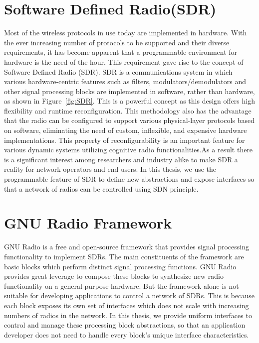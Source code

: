 \section{Software Defined Radio(SDR)}
Most of the wireless protocols in use today are implemented in hardware. With the ever increasing number of protocols to be supported and their diverse requirements, it has become apparent that a programmable environment for hardware is the need of the hour. This requirement gave rise to the concept of Software Defined Radio (SDR). SDR is a communications system in which various hardware-centric features such as filters, modulators/demodulators and other signal processing blocks are implemented in software, rather than hardware, as shown in Figure~\ref{fig:SDR}. This is a powerful concept as this design offers high flexibility and runtime reconfiguration. This methodology also has the advantage that the radio can be configured to support various physical-layer protocols based on software, eliminating the need of custom, inflexible, and expensive hardware implementations. This property of reconfigurability is an important feature for various dynamic systems utilizing cognitive radio functionalities.As a result there is a significant interest among researchers and industry alike to make SDR a reality for network operators and end users. In this thesis, we use the programmable feature of SDR to define new abstractions and expose interfaces so that a network of radios can be controlled using SDN principle. 

\section{GNU Radio Framework}
GNU Radio \cite{gnuradio} is a free and open-source framework that provides signal processing functionality to implement SDRs. The main constituents of the framework are basic blocks which perform distinct signal processing functions. GNU Radio provides great leverage to compose these blocks to synthesize new radio functionality on a general purpose hardware. But the framework alone is not suitable for developing applications to control a network of SDRs. This is because each block exposes its own set of interfaces which does not scale with increasing numbers of radios in the network. In this thesis, we provide uniform interfaces to control and manage these processing block abstractions, so that an application developer does not need to handle every block's unique interface characteristics.

